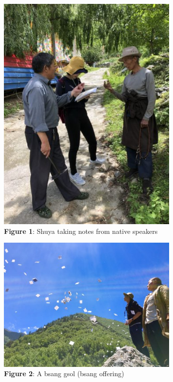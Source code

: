 \documentclass[
  a4paper,
  14pt,
  oneside,
  tablecaptionabove
]{scrbook}
\begin{document}
\begin{figure}[h!]
\centering
\includegraphics[width=0.8\textwidth]{images/IMG_2558-375x500.jpg}
\captionsetup{labelformat=empty}
\caption{\textbf{Figure 1}: Shuya taking notes from native speakers}
\end{figure}


\begin{figure}[h!]
\centering
\includegraphics[width=0.8\textwidth]{images/IMG_7418-500x375.jpg}
\captionsetup{labelformat=empty}
\caption{\textbf{Figure 2}: A bsang gsol (bsang offering)}
\end{figure}
\end{document}

